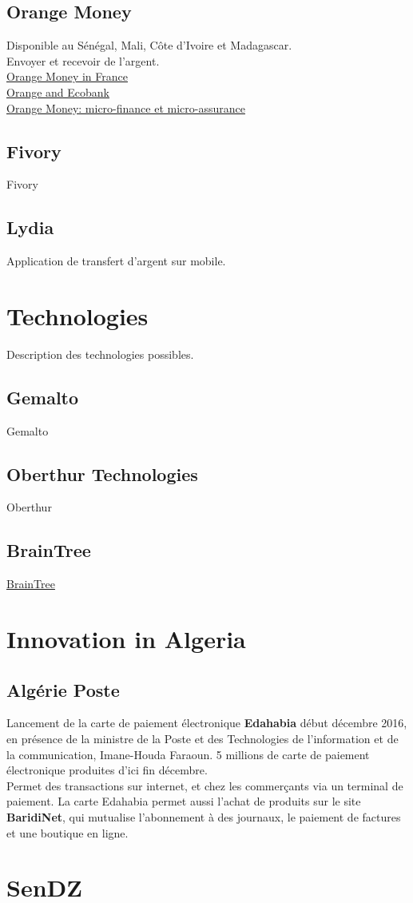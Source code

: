 \documentclass{report}
\begin{document}
\section{Orange Money}
Disponible au Sénégal, Mali, Côte d'Ivoire et Madagascar. \\
Envoyer et recevoir de l'argent. \\
\href{http://www.orange.com/en/Press-and-medias/press-releases-2016/Orange-launches-Orange-Money-in-France-to-allow-money-transfers-to-three-countries-in-Africa-and-within-mainland-France}{Orange Money in France} \\
\href{http://www.orange.com/en/Press-and-medias/press-releases-2016/Orange-and-Ecobank-launch-a-bank-to-wallet-money-transfer-service-linked-to-Orange-Money-in-Cote-d-Ivoire-Guinea-Conakry-and-Niger}{Orange and Ecobank} \\
\href{http://www.jeuneafrique.com/355624/economie/orange-money-vise-de-nouveaux-partenariats-microfinance-microassurance/}{Orange Money: micro-finance et micro-assurance}
\section{Fivory}
Fivory
\section{Lydia}
Application de transfert d'argent sur mobile.

\chapter{Technologies}
Description des technologies possibles.
\section{Gemalto}
Gemalto
\section{Oberthur Technologies}
Oberthur
\section{BrainTree}
\href{https://www.braintreepayments.com/}{BrainTree}

\chapter{Innovation in Algeria}
\section{Algérie Poste}
Lancement de la carte de paiement électronique \textbf{Edahabia} début décembre 2016,
en présence de la ministre de la Poste et des Technologies de l'information et de la communication, Imane-Houda Faraoun.
5 millions de carte de paiement électronique produites d'ici fin décembre. \\
Permet des transactions sur internet, et chez les commerçants via un terminal de paiement.
La carte Edahabia permet aussi l'achat de produits sur le site \textbf{BaridiNet}, qui mutualise l'abonnement à des journaux, le paiement de factures et une boutique en ligne.

\chapter{SenDZ}
\end{document}
